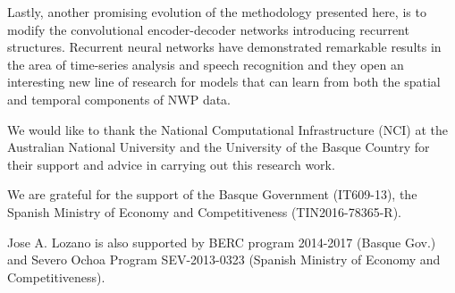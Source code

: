 \documentclass[twocol]{ametsoc}
\begin{document}
Lastly, another promising evolution of the methodology presented here, is to modify the convolutional encoder-decoder networks introducing recurrent structures. Recurrent neural networks \citep{mikolov2010recurrent} have demonstrated remarkable results in the area of time-series analysis and speech recognition and they open an interesting new line of research for models that can learn from both the spatial and temporal components of NWP data.

\acknowledgments

We would like to thank the National Computational Infrastructure (NCI) at the Australian National University and the University of the Basque Country for their support and advice in carrying out this research work.

We are grateful for the support of the Basque Government (IT609-13), the Spanish Ministry of Economy and Competitiveness (TIN2016-78365-R). 

Jose A. Lozano is also supported by BERC program 2014-2017 (Basque Gov.) and Severo Ochoa Program SEV-2013-0323 (Spanish Ministry of Economy and Competitiveness).



 
 
\end{document}
